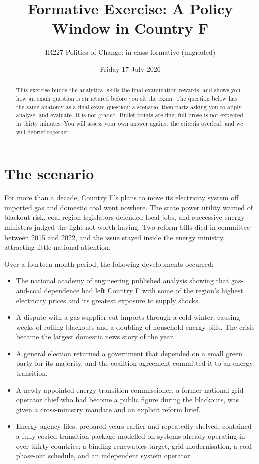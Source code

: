 \documentclass[nobib]{tufte-handout}
\title{Formative Exercise: A Policy Window in Country F}
\author{IR227 Politics of Change: in-class formative (ungraded)}
\date{Friday 17 July 2026}
\begin{document}
\maketitle

\begin{abstract}
\noindent
This exercise builds the analytical skills the final examination rewards, and shows you how an exam question is structured before you sit the exam. The question below has the same anatomy as a final-exam question: a scenario, then parts asking you to apply, analyse, and evaluate. It is not graded. Bullet points are fine; full prose is not expected in thirty minutes. You will assess your own answer against the criteria overleaf, and we will debrief together.
\end{abstract}

\section{The scenario}

For more than a decade, Country F's plans to move its electricity system off imported gas and domestic coal went nowhere. The state power utility warned of blackout risk, coal-region legislators defended local jobs, and successive energy ministers judged the fight not worth having. Two reform bills died in committee between 2015 and 2022, and the issue stayed inside the energy ministry, attracting little national attention.

Over a fourteen-month period, the following developments occurred:

\begin{itemize}\itemsep=2pt
\item The national academy of engineering published analysis showing that gas-and-coal dependence had left Country F with some of the region's highest electricity prices and its greatest exposure to supply shocks.
\item A dispute with a gas supplier cut imports through a cold winter, causing weeks of rolling blackouts and a doubling of household energy bills. The crisis became the largest domestic news story of the year.
\item A general election returned a government that depended on a small green party for its majority, and the coalition agreement committed it to an energy transition.
\item A newly appointed energy-transition commissioner, a former national grid-operator chief who had become a public figure during the blackouts, was given a cross-ministry mandate and an explicit reform brief.
\item Energy-agency files, prepared years earlier and repeatedly shelved, contained a fully costed transition package modelled on systems already operating in over thirty countries: a binding renewables target, grid modernisation, a coal phase-out schedule, and an independent system operator.
\end{itemize}
\end{document}
